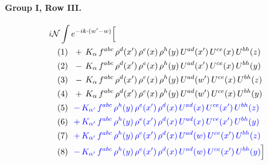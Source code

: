 \documentclass[10pt]{article}
\numberwithin{equation}{section}
\newcommand{\NN}{\mathcal N}
\begin{document}
\paragraph{Group I, Row III.}
\begin{align*}
&i\NN\int e^{-ik\cdot(w'-w)}\Big[\\
&\quad\text{(1)}\ \ +\,K_{\alpha}\,f^{abc}\,\rho^{d}(x')\,\rho^{e}(x)\,\rho^{h}(y)\,U^{ad}(x')\,U^{ce}(x)\,U^{bh}(z)\\
&\quad\text{(2)}\ \ -\,K_{\alpha}\,f^{abc}\,\rho^{d}(x')\,\rho^{e}(x)\,\rho^{h}(y)\,U^{ad}(x')\,U^{ce}(x)\,U^{bh}(y)\\
&\quad\text{(3)}\ \ -\,K_{\alpha}\,f^{abc}\,\rho^{d}(x')\,\rho^{e}(x)\,\rho^{h}(y)\,U^{ad}(w')\,U^{ce}(x)\,U^{bh}(z)\\
&\quad\text{(4)}\ \ +\,K_{\alpha}\,f^{abc}\,\rho^{d}(x')\,\rho^{e}(x)\,\rho^{h}(y)\,U^{ad}(w')\,U^{ce}(x)\,U^{bh}(y)\\
&\quad\text{(5)}\ \ \textcolor{blue}{-\,K_{\alpha'}\,f^{abc}\,\rho^{h}(y)\,\rho^{e}(x')\,\rho^{d}(x)\,U^{ad}(x)\,U^{ce}(x')\,U^{bh}(z)}\\
&\quad\text{(6)}\ \ \textcolor{blue}{+\,K_{\alpha'}\,f^{abc}\,\rho^{h}(y)\,\rho^{e}(x')\,\rho^{d}(x)\,U^{ad}(x)\,U^{ce}(x')\,U^{bh}(y)}\\
&\quad\text{(7)}\ \ \textcolor{blue}{+\,K_{\alpha'}\,f^{abc}\,\rho^{h}(y)\,\rho^{e}(x')\,\rho^{d}(x)\,U^{ad}(w)\,U^{ce}(x')\,U^{bh}(z)}\\
&\quad\text{(8)}\ \ \textcolor{blue}{-\,K_{\alpha'}\,f^{abc}\,\rho^{h}(y)\,\rho^{e}(x')\,\rho^{d}(x)\,U^{ad}(w)\,U^{ce}(x')\,U^{bh}(y)}\Big]
\end{align*}
\end{document}
